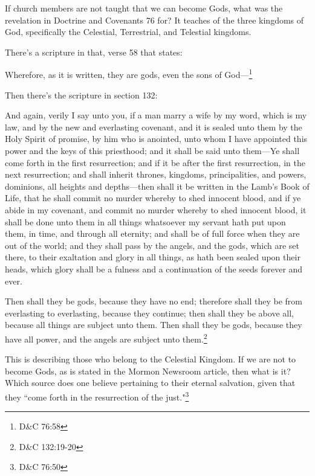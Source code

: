 \documentclass{article}
\begin{document}
If church members are not taught that we can become Gods, what was the 
revelation in Doctrine and Covenants 76 for? It teaches of the three kingdoms
of God, specifically the Celestial, Terrestrial, and Telestial kingdoms.

There's a scripture in that, verse 58 that states:

\begin{displayquote}
Wherefore, as it is written, they are gods, even the sons of 
God—\footnote{D\&C 76:58}
\end{displayquote}

Then there's the scripture in section 132:

\begin{displayquote}
And again, verily I say unto you, if a man marry a wife by my 
word, which is my law, and by the new and everlasting covenant, 
and it is sealed unto them by the Holy Spirit of promise, by him 
who is anointed, unto whom I have appointed this power and the keys
of this priesthood; and it shall be said unto them—Ye shall come 
forth in the first resurrection; and if it be after the first 
resurrection, in the next resurrection; and shall inherit thrones, 
kingdoms, principalities, and powers, dominions, all heights and 
depths—then shall it be written in the Lamb’s Book of Life, that 
he shall commit no murder whereby to shed innocent blood, and if 
ye abide in my covenant, and commit no murder whereby to shed innocent 
blood, it shall be done unto them in all things whatsoever my servant 
hath put upon them, in time, and through all eternity; and shall be of 
full force when they are out of the world; and they shall pass by the 
angels, and the gods, which are set there, to their exaltation and 
glory in all things, as hath been sealed upon their heads, which 
glory shall be a fulness and a continuation of the seeds 
forever and ever.

Then shall they be gods, because they have no end; therefore shall 
they be from everlasting to everlasting, because they continue; then 
shall they be above all, because all things are subject unto them. 
Then shall they be gods, because they have all power, and the 
angels are subject unto them.\footnote{D\&C 132:19-20}
\end{displayquote}

This is describing those who belong to the Celestial Kingdom. If we are not to
become Gods, as is stated in the Mormon Newsroom article, then what is it? Which
source does one believe pertaining to their eternal salvation, given that they
``come forth in the resurrection of the just."\footnote{D\&C 76:50} 
\end{document}
